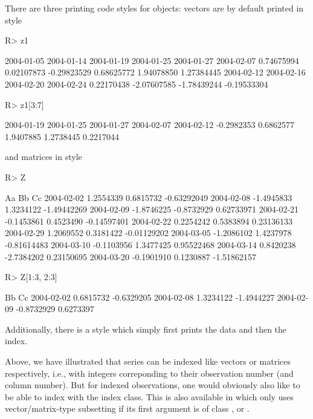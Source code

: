 \documentclass[article,nojss]{jss}
\begin{document}
There are three printing code styles for  objects: vectors are by default
printed in  style
\begin{Schunk}
\begin{Sinput}
R> z1
\end{Sinput}
\begin{Soutput}
 2004-01-05  2004-01-14  2004-01-19  2004-01-25  2004-01-27  2004-02-07 
 0.74675994  0.02107873 -0.29823529  0.68625772  1.94078850  1.27384445 
 2004-02-12  2004-02-16  2004-02-20  2004-02-24 
 0.22170438 -2.07607585 -1.78439244 -0.19533304 
\end{Soutput}
\begin{Sinput}
R> z1[3:7]
\end{Sinput}
\begin{Soutput}
2004-01-19 2004-01-25 2004-01-27 2004-02-07 2004-02-12 
-0.2982353  0.6862577  1.9407885  1.2738445  0.2217044 
\end{Soutput}
\end{Schunk}
and matrices in  style
\begin{Schunk}
\begin{Sinput}
R> Z
\end{Sinput}
\begin{Soutput}
                   Aa         Bb          Cc
2004-02-02  1.2554339  0.6815732 -0.63292049
2004-02-08 -1.4945833  1.3234122 -1.49442269
2004-02-09 -1.8746225 -0.8732929  0.62733971
2004-02-21 -0.1453861  0.4523490 -0.14597401
2004-02-22  0.2254242  0.5383894  0.23136133
2004-02-29  1.2069552  0.3181422 -0.01129202
2004-03-05 -1.2086102  1.4237978 -0.81614483
2004-03-10 -0.1103956  1.3477425  0.95522468
2004-03-14  0.8420238 -2.7384202  0.23150695
2004-03-20 -0.1901910  0.1230887 -1.51862157
\end{Soutput}
\begin{Sinput}
R> Z[1:3, 2:3]
\end{Sinput}
\begin{Soutput}
                   Bb         Cc
2004-02-02  0.6815732 -0.6329205
2004-02-08  1.3234122 -1.4944227
2004-02-09 -0.8732929  0.6273397
\end{Soutput}
\end{Schunk}
Additionally, there is a  style which simply first prints the data 
and then the index.

Above, we have illustrated that  series can be indexed like vectors
or matrices respectively, i.e., with integers correponding to their observation
number (and column number). But for indexed observations, one would obviously also
like to be able to index with the index class. This is also available in \code{[}
which only uses vector/matrix-type subsetting if its first argument is of class
,  or .
\end{document}
